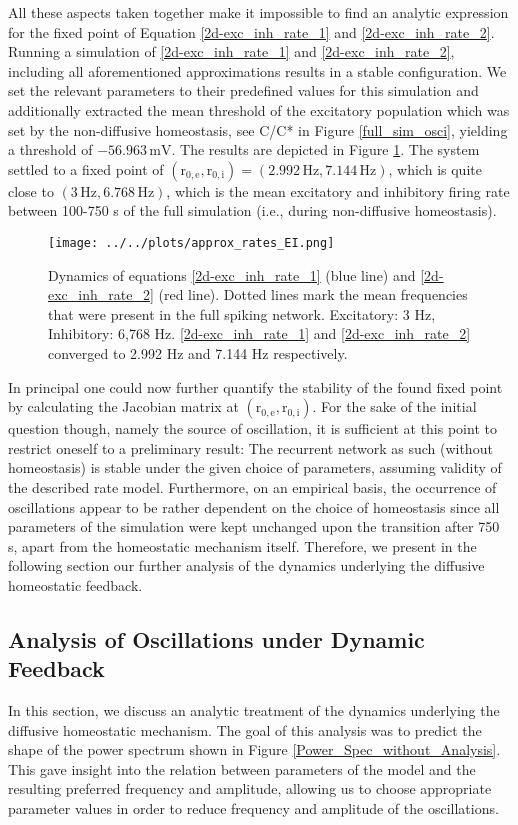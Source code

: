 \documentclass[10pt,a4paper]{article}
\begin{document}
All these aspects taken together make it impossible to find an analytic expression for the fixed point of Equation \ref{2d-exc_inh_rate_1} and \ref{2d-exc_inh_rate_2}. Running a simulation of \ref{2d-exc_inh_rate_1} and \ref{2d-exc_inh_rate_2}, including all aforementioned approximations results in a stable configuration. We set the relevant parameters to their predefined values for this simulation and additionally extracted the mean threshold of the excitatory population which was set by the non-diffusive homeostasis, see C/C* in Figure \ref{full_sim_osci}, yielding a threshold of $\mathrm{-56.963\, mV}$. The results are depicted in Figure \ref{Dyn_Rate_Approx}. The system settled to a fixed point of $\mathrm{(r_{0,e},r_{0,i}) = (2.992\, Hz, 7.144\, Hz)}$, which is quite close to $\mathrm{(3\, Hz, 6.768\, Hz)}$, which is the mean excitatory and inhibitory firing rate between 100-750 s of the full simulation (i.e., during non-diffusive homeostasis).
\begin{figure}
\begin{center}
\texttt{[image: ../../plots/approx\_rates\_EI.png]}
\end{center}
\caption{Dynamics of equations \ref{2d-exc_inh_rate_1} (blue line) and \ref{2d-exc_inh_rate_2} (red line). Dotted lines mark the mean frequencies that were present in the full spiking network. Excitatory: 3 Hz, Inhibitory: 6,768 Hz. \ref{2d-exc_inh_rate_1} and \ref{2d-exc_inh_rate_2} converged to 2.992 Hz and 7.144 Hz respectively.}
\label{Dyn_Rate_Approx}
\end{figure}
In principal one could now further quantify the stability of the found fixed point by calculating the Jacobian matrix at $\mathrm{(r_{0,e},r_{0,i})}$. For the sake of the initial question though, namely the source of oscillation, it is sufficient at this point to restrict oneself to a preliminary result: The recurrent network as such (without homeostasis) is stable under the given choice of parameters, assuming validity of the described rate model. Furthermore, on an empirical basis, the occurrence of oscillations appear to be rather dependent on the choice of homeostasis since all parameters of the simulation were kept unchanged upon the transition after 750 s, apart from the homeostatic mechanism itself. Therefore, we present in the following section our further analysis of the dynamics underlying the diffusive homeostatic feedback.

\subsection{Analysis of Oscillations under Dynamic Feedback}\label{theor_osc}
In this section, we discuss an analytic treatment of the dynamics underlying the diffusive homeostatic mechanism. The goal of this analysis was to predict the shape of the power spectrum shown in Figure \ref{Power_Spec_without_Analysis}. This gave insight into the relation between parameters of the model and the resulting preferred frequency and amplitude, allowing us to choose appropriate parameter values in order to reduce frequency and amplitude of the oscillations.
\end{document}
